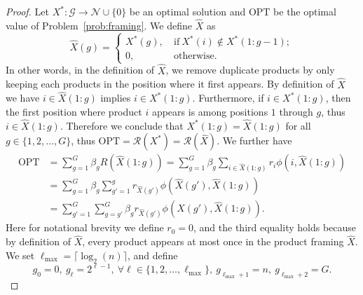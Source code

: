 \documentclass[10pt,a4paper]{amsart}
\begin{document}
\begin{proof}

Let $X^*:\mathcal{G}\to\mathcal{N}\cup\{0\}$ be an optimal solution and $\text{OPT}$ be the optimal value of Problem~\eqref{prob:framing}. We define $\hat{X}$ as
\begin{equation*}
\hat{X}(g)=\begin{cases}
X^*(g),\ &\text{if}\ X^*(i)\notin X^*(1:g-1);\\
0,\ &\text{otherwise}.
\end{cases}
\end{equation*}
In other words, in the definition of $\hat{X}$, we remove duplicate products by only keeping each products in the position where it first appears. By definition of $\hat{X}$ we have $i\in \hat{X}(1:g)$ implies $i\in X^*(1:g)$. Furthermore, if $i\in X^*(1:g)$, then the first position where product $i$ appears is among positions $1$ through $g$, thus $i\in \hat{X}(1:g)$. Therefore we conclude that $X^*(1:g)=\hat{X}(1:g)$ for all $g\in\{1,2,\dots,G\}$, thus $\text{OPT}=\mathcal{R}(X^*)=\mathcal{R}(\hat{X})$. We further have
\begin{equation}\label{eq:framing_1}
\begin{split}
\text{OPT}&=\sum_{g=1}^G\beta_gR(\hat{X}(1:g))=\sum_{g=1}^G\beta_g\sum_{i\in \hat{X}(1:g)}r_i\phi(i,\hat{X}(1:g))\\
&=\sum_{g=1}^G\beta_g\sum_{g'=1}^g r_{\hat{X}(g')}\phi(\hat{X}(g'),\hat{X}(1:g))\\
&=\sum_{g'=1}^G\sum_{g=g'}^G \beta_g r_{\hat{X}(g')}\phi(\hat{X}(g'),\hat{X}(1:g)).
\end{split}
\end{equation}
Here for notational brevity we define $r_0=0$, and the third equality holds because by definition of $\hat{X}$, every product appears at most once in the product framing $\hat{X}$. We set $\ell_{\max}=\lceil\log_2(n)\rceil$, and define
\begin{equation*}
g_0=0,\ g_\ell=2^{\ell-1},\ \forall \ell\in\{1,2,\dots,\ell_{\max}\},\ g_{\ell_{\max}+1}=n,\ g_{\ell_{\max}+2}=G.
\end{equation*}


\end{proof}
\end{document}
